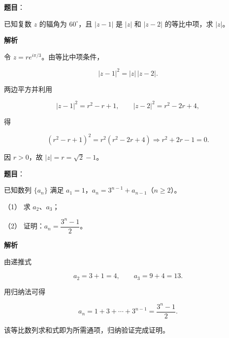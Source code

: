 \begin{answer}

\textbf{题目}：

已知复数 $z$ 的辐角为 $60^\circ$，且 $|z-1|$ 是 $|z|$ 和 $|z-2|$ 的等比中项，求 $|z|$。

\textbf{解析}

令 $z=re^{i\pi/3}$。由等比中项条件，

\nopagebreak[4]
\[
|z-1|^2=|z|\,|z-2|.
\]

两边平方并利用

\nopagebreak[4]
\[
|z-1|^2=r^2-r+1,\qquad |z-2|^2=r^2-2r+4,
\]

得

\nopagebreak[4]
\[
(r^2-r+1)^2=r^2(r^2-2r+4)
\Longrightarrow r^2+2r-1=0.
\]

因 $r>0$，故 $|z|=r=\sqrt2-1$。


\end{answer}
\begin{answer}

\textbf{题目}：

已知数列 $\{a_n\}$ 满足 $a_1=1$，$a_n=3^{n-1}+a_{n-1}$（$n\geqslant2$）。

（1） 求 $a_2\text{、}a_3$；

（2） 证明：$a_n=\dfrac{3^n-1}{2}$。

\textbf{解析}


由递推式

\nopagebreak[4]
\[
a_2=3+1=4,\qquad a_3=9+4=13.
\]

用归纳法可得

\nopagebreak[4]
\[
a_n=1+3+\cdots+3^{n-1}=\frac{3^n-1}{2}.
\]


该等比数列求和式即为所需通项，归纳验证完成证明。



\end{answer}
